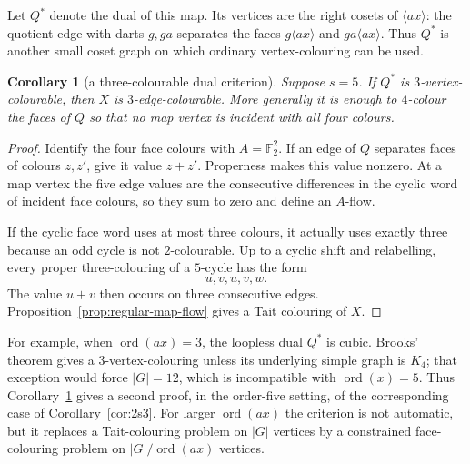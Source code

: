 \documentclass[11pt,a4paper]{article}
\newtheorem{corollary}[theorem]{Corollary}
\theoremstyle{definition}
\theoremstyle{remark}
\newcommand{\ord}{\operatorname{ord}}
\begin{document}
Let $Q^*$ denote the dual of this map.  Its vertices are the right cosets of $\langle ax\rangle$: the quotient edge with darts $g,ga$ separates the faces $g\langle ax\rangle$ and $ga\langle ax\rangle$.  Thus $Q^*$ is another small coset graph on which ordinary vertex-colouring can be used.
\begin{corollary}[a three-colourable dual criterion]\label{cor:dual-three-colour}
Suppose $s=5$.  If $Q^*$ is $3$-vertex-colourable, then $X$ is $3$-edge-colourable.  More generally it is enough to $4$-colour the faces of $Q$ so that no map vertex is incident with all four colours.
\end{corollary}
\begin{proof}
Identify the four face colours with $A=\mathbb F_2^2$.  If an edge of $Q$ separates faces of colours $z,z'$, give it value $z+z'$.  Properness makes this value nonzero.  At a map vertex the five edge values are the consecutive differences in the cyclic word of incident face colours, so they sum to zero and define an $A$-flow.

If the cyclic face word uses at most three colours, it actually uses exactly three because an odd cycle is not $2$-colourable.  Up to a cyclic shift and relabelling, every proper three-colouring of a $5$-cycle has the form
\[
 u,v,u,v,w.
\]
The value $u+v$ then occurs on three consecutive edges.  Proposition~\ref{prop:regular-map-flow} gives a Tait colouring of $X$.
\end{proof}

For example, when $\ord(ax)=3$, the loopless dual $Q^*$ is cubic.  Brooks' theorem gives a $3$-vertex-colouring unless its underlying simple graph is $K_4$; that exception would force $|G|=12$, which is incompatible with $\ord(x)=5$.  Thus Corollary~\ref{cor:dual-three-colour} gives a second proof, in the order-five setting, of the corresponding case of Corollary~\ref{cor:2s3}.  For larger $\ord(ax)$ the criterion is not automatic, but it replaces a Tait-colouring problem on $|G|$ vertices by a constrained face-colouring problem on $|G|/\ord(ax)$ vertices.
\end{document}
